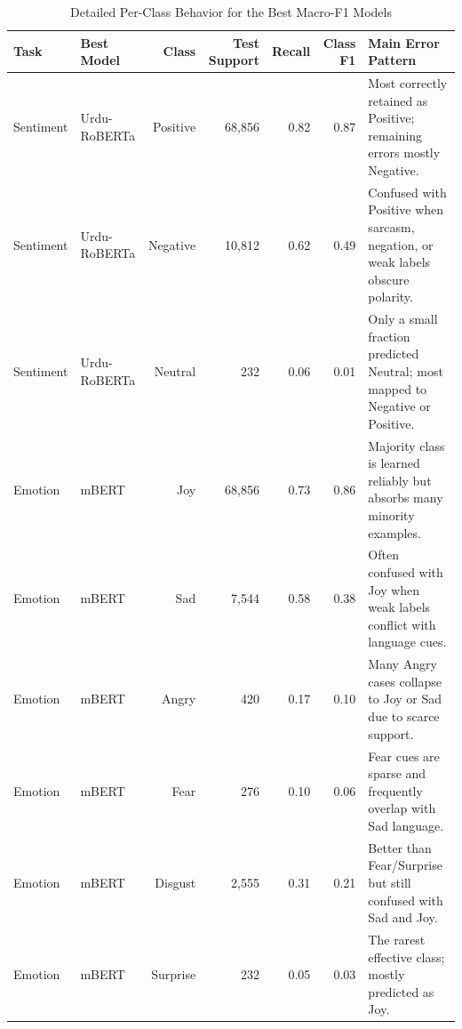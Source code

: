 \begin{table}[t]
\caption{Detailed Per-Class Behavior for the Best Macro-F1 Models}
\label{tab:best-model-per-class}
\centering
\footnotesize
\setlength{\tabcolsep}{5pt}
\begin{tabular}{llrrrrp{5.3cm}}
\toprule
Task & Best Model & Class & Test Support & Recall & Class F1 & Main Error Pattern \\
\midrule
Sentiment & Urdu-RoBERTa & Positive & 68,856 & 0.82 & 0.87 & Most correctly retained as Positive; remaining errors mostly Negative. \\
Sentiment & Urdu-RoBERTa & Negative & 10,812 & 0.62 & 0.49 & Confused with Positive when sarcasm, negation, or weak labels obscure polarity. \\
Sentiment & Urdu-RoBERTa & Neutral  & 232    & 0.06 & 0.01 & Only a small fraction predicted Neutral; most mapped to Negative or Positive. \\
\midrule
Emotion & mBERT & Joy      & 68,856 & 0.73 & 0.86 & Majority class is learned reliably but absorbs many minority examples. \\
Emotion & mBERT & Sad      & 7,544  & 0.58 & 0.38 & Often confused with Joy when weak labels conflict with language cues. \\
Emotion & mBERT & Angry    & 420    & 0.17 & 0.10 & Many Angry cases collapse to Joy or Sad due to scarce support. \\
Emotion & mBERT & Fear     & 276    & 0.10 & 0.06 & Fear cues are sparse and frequently overlap with Sad language. \\
Emotion & mBERT & Disgust  & 2,555  & 0.31 & 0.21 & Better than Fear/Surprise but still confused with Sad and Joy. \\
Emotion & mBERT & Surprise & 232    & 0.05 & 0.03 & The rarest effective class; mostly predicted as Joy. \\
\bottomrule
\end{tabular}
\end{table}


